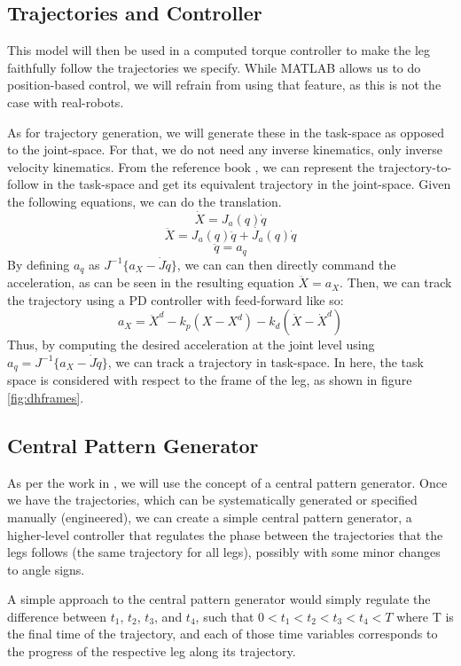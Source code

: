 \subsection{Trajectories and Controller} \label{sec:trajectories}
This model will then be used in a computed torque controller to make the leg faithfully follow the trajectories we specify. While MATLAB allows us to do position-based control, we will refrain from using that feature, as this is not the case with real-robots.

As for trajectory generation, we will generate these in the task-space as opposed to the joint-space. For that, we do not need any inverse kinematics, only inverse velocity kinematics. From the reference book \cite{spong2006robot}, we can represent the trajectory-to-follow in the task-space and get its equivalent trajectory in the joint-space.
Given the following equations, we can do the translation.
$$
\dot{X} = J_a(q)\dot{q} 
$$
$$
\ddot{X} = J_a(q)\ddot{q} + \dot{J_a}(q)\dot{q}
$$
$$
\ddot{q} = a_q
$$
By defining $a_q$ as $J^{-1}\{a_X - \dot{J}\dot{q}\}$, we can can then directly command the acceleration, as can be seen in the resulting equation $\ddot{X} = a_X$. Then, we can track the trajectory using a PD controller with feed-forward like so:
$$
a_X = \ddot{X}^d - k_p (X - X^d) - k_d (\dot{X} - \dot{X}^d)
$$
Thus, by computing the desired acceleration at the joint level using $a_q = J^{-1}\{a_X - \dot{J}\dot{q}\}$, we can track a trajectory in task-space. In here, the task space is considered with respect to the frame of the leg, as shown in figure \ref{fig:dhframes}.

\subsection{Central Pattern Generator}
As per the work in \cite{kimura2007adaptive}, we will use the concept of a central pattern generator. Once we have the trajectories, which can be systematically generated or specified manually (engineered), we can create a simple central pattern generator, a higher-level controller that regulates the phase between the trajectories that the legs follows (the same trajectory for all legs), possibly with some minor changes to angle signs.

A simple approach to the central pattern generator would simply regulate the difference between $t_1$, $t_2$, $t_3$, and $t_4$, such that $0 < t_1 < t_2 < t_3 < t_4 < T$ where T is the final time of the trajectory, and each of those time variables corresponds to the progress of the respective leg along its trajectory.


